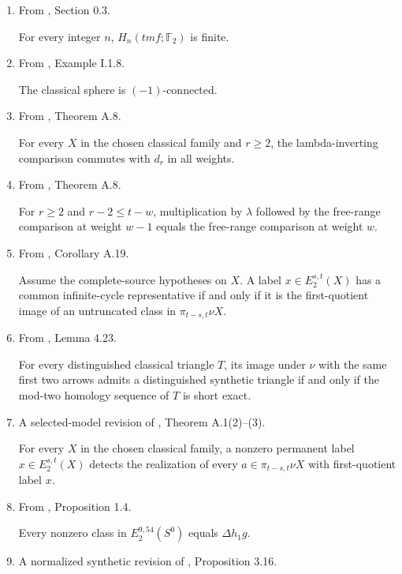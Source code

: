 \begin{theorem}
\begin{enumerate}
The label $h_1\in E_2^{1,2}(S^0)$ is a nonzero permanent cycle.
\item From \cite{BR21}, Section 0.3.\par

For every integer $n$, $H_n(\mathit{tmf};\mathbb F_2)$ is finite.
\item From \cite{SchwedeSymmetricSpectra}, Example I.1.8.\par

The classical sphere is $(-1)$-connected.
\item From \cite{BHS}, Theorem A.8.\par

For every $X$ in the chosen classical family and $r\ge2$, the lambda-inverting comparison commutes with $d_r$ in all weights.
\item From \cite{BHS}, Theorem A.8.\par

For $r\ge2$ and $r-2\le t-w$, multiplication by $\lambda$ followed by the free-range comparison at weight $w-1$ equals the free-range comparison at weight $w$.
\item From \cite{BHS}, Corollary A.19.\par

Assume the complete-source hypotheses on $X$. A label $x\in E_2^{s,t}(X)$ has a common infinite-cycle representative if and only if it is the first-quotient image of an untruncated class in $\pi_{t-s,t}\nu X$.
\item From \cite{Pst}, Lemma 4.23.\par

For every distinguished classical triangle $T$, its image under $\nu$ with the same first two arrows admits a distinguished synthetic triangle if and only if the mod-two homology sequence of $T$ is short exact.
\item A selected-model revision of \cite{BHS}, Theorem A.1(2)--(3).\par

For every $X$ in the chosen classical family, a nonzero permanent label $x\in E_2^{s,t}(X)$ detects the realization of every $a\in\pi_{t-s,t}\nu X$ with first-quotient label $x$.
\item From \cite{BR21}, Proposition 1.4.\par

Every nonzero class in $E_2^{9,54}(S^0)$ equals $\Delta h_1g$.
\item A normalized synthetic revision of \cite{LWX126}, Proposition 3.16.\par


\end{enumerate}
\end{theorem}
